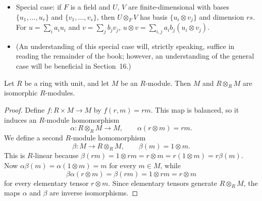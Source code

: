 \documentclass[../Odyssey_Project.tex]{subfiles}
\begin{document}
\begin{itemize}
\begin{itemize}
        \item $(rm) \otimes n = r(m \otimes n)$.
    \end{itemize}
    A general element of $M \otimes_S N$ is a \emph{sum} of elementary tensors, not just one.
    \item Special case: if $F$ is a field and $U$, $V$ are finite-dimensional with bases $\{u_1, \ldots, u_r\}$ and $\{v_1, \ldots, v_s\}$, then $U \otimes_F V$ has basis $\{u_i \otimes v_j\}$ and dimension $rs$. For $u = \sum_i a_i u_i$ and $v = \sum_j b_j v_j$, $u \otimes v = \sum_{i,j} a_i b_j (u_i \otimes v_j)$.
    \item (An understanding of this special case will, strictly speaking, suffice in reading the remainder of the book; however, an understanding of the general case will be beneficial in Section~16.)
\end{itemize}

\begin{proposition}
\label{prop:12.2}
Let $R$ be a ring with unit, and let $M$ be an $R$-module. Then $M$ and $R \otimes_R M$ are isomorphic $R$-modules.
\end{proposition}
\begin{proof}
    Define $f \colon R \times M \to M$ by $f(r,m) = rm$. This map is balanced, so it induces an $R$-module homomorphism
    \[
        \alpha \colon R \otimes_R M \to M, \qquad \alpha(r \otimes m) = rm.
    \]
    We define a second $R$-module homomorphism
    \[
        \beta \colon M \to R \otimes_R M, \qquad \beta(m) = 1 \otimes m.
    \]
    This is $R$-linear because $\beta(rm) = 1 \otimes rm = r \otimes m = r(1 \otimes m) = r\beta(m)$. Now $\alpha\beta(m) = \alpha(1 \otimes m) = m$ for every $m \in M$, while
    \[
        \beta\alpha(r \otimes m) = \beta(rm) = 1 \otimes rm = r \otimes m
    \]
    for every elementary tensor $r \otimes m$. Since elementary tensors generate $R \otimes_R M$, the maps $\alpha$ and $\beta$ are inverse isomorphisms.
\end{proof}
\end{document}
